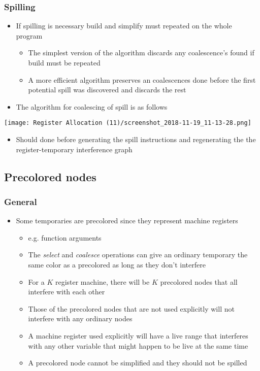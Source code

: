 \documentclass[11pt]{article}
\begin{document}
\subsubsection{Spilling}
\label{sec:orgb960e55}
\begin{itemize}
\item If spilling is necessary build and simplify must repeated on the whole program
\begin{itemize}
\item The simplest version of the algorithm discards any coalescence's found if build must be repeated
\item A more efficient algorithm preserves an coalescences done before the first potential spill was discovered and discards the rest
\end{itemize}

\item The algorithm for coalescing of spill is as follows
\end{itemize}
\begin{center}
\texttt{[image: Register Allocation (11)/screenshot\_2018-11-19\_11-13-28.png]}
\end{center}
\begin{itemize}
\item Should done before generating the spill instructions and regenerating the the register-temporary interference graph
\end{itemize}

\subsection{Precolored nodes}
\label{sec:org4e46906}
\subsubsection{General}
\label{sec:orge360ac5}
\begin{itemize}
\item Some temporaries are precolored since they represent machine registers
\begin{itemize}
\item e.g. function arguments
\item The \emph{select} and \emph{coalesce} operations can give an ordinary temporary the same color as a precolored as long as they don't interfere
\item For a \(K\) register machine, there will be \(K\) precolored nodes that all interfere with each other
\item Those of the precolored nodes that are not used explicitly will not interfere with any ordinary nodes
\item A machine register used explicitly will have a live range that interferes with any other variable that might happen to be live at the same time
\item A precolored node cannot be simplified and they should not be spilled
\end{itemize}
\end{itemize}
\end{document}
